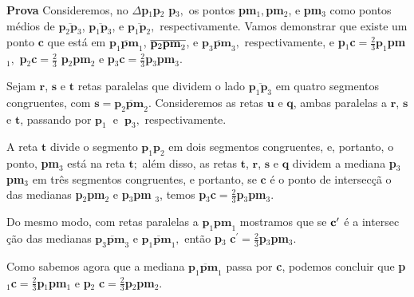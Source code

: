 \documentclass[12pt,a4paper]{book}
\begin{document}
{\bf Prova}
 Consideremos, no $\Delta $\textbf{p}$_{1}$\textbf{p}$_{2}$\textbf{%
p}$_{3},$ os pontos \textbf{pm}$_{1},$\textbf{pm}$_{2}$, e \textbf{pm}$_{3}$
como pontos m\'{e}dios de $\overline{\mathbf{p}_{2}\mathbf{p}_{3}}$, $%
\overline{\mathbf{p}_{1}\mathbf{p}_{3}}$, e $\overline{\mathbf{p}_{1}\mathbf{p%
}_{2}},$ respectivamente. Vamos demonstrar que existe um ponto $\mathbf{c}$
que est\'{a} em $\overline{\mathbf{p}_{1}\mathbf{pm}_{1}}$, $\overline{%
\mathbf{p}_{2}\mathbf{pm}_{2}}$, e $\overline{\mathbf{p}_{3}\mathbf{pm}_{3}},$
respectivamente, e \textbf{p}$_{1}$\textbf{c}$\mathbf{=}\frac{2}{3}\mathbf{p}%
_{1}$\textbf{pm}$_{1},$ \textbf{p}$_{2}$\textbf{c}$\mathbf{=}\frac{2}{3}$%
\textbf{p}$_{2}$\textbf{pm}$_{2}$ e \textbf{p}$_{3}$\textbf{c}$\mathbf{=}%
\frac{2}{3}$\textbf{p}$_{3}$\textbf{pm}$_{3}.$

Sejam $\mathbf{r}$, $\mathbf{s}$ e $\mathbf{t}$ retas paralelas que dividem o lado $\overline{\mathbf{p}_{1}\mathbf{p}_{3}}$ em quatro segmentos congruentes, com $\mathbf{s=}\overline{\mathbf{p}_{2}\mathbf{pm}_{2}}$. Consideremos as retas $\mathbf{u}$ e $\mathbf{q}$, ambas paralelas a $\mathbf{r}$, $\mathbf{s}$ e $\mathbf{t}$, passando por $\mathbf{p}_{1}$\textbf{\ }e\textbf{\ }$\mathbf{p}_{3},$ respectivamente.

A reta $\mathbf{t}$ divide o segmento $\mathbf{p}_{1}\mathbf{p}_{2}$ em
dois segmentos congruentes, e, portanto, o ponto, \textbf{pm}$_{3}$ est\'{a}
na reta $\mathbf{t};$ al\'{e}m disso, as retas $\mathbf{t}$, $\mathbf{r}$, $\mathbf{s}$ 
e $\mathbf{q}$ dividem a mediana \textbf{p}$_{3}$\textbf{pm}$_{3}$ em tr\^{e}s 
segmentos congruentes, e portanto, se $\mathbf{c}$ \'{e} o ponto de intersec\c{c}\~{a}%
o das medianas \textbf{p}$_{2}$\textbf{pm}$_{2}$ e \textbf{p}$_{3}$\textbf{pm%
}$_{3}$, temos \textbf{p}$_{3}$\textbf{c}$\mathbf{=}\frac{2}{3}$\textbf{p}$%
_{3}$\textbf{pm}$_{3}.$

Do mesmo modo, com retas paralelas a $\mathbf{p}_{1}\mathbf{pm}_{1}$ mostramos que se $\bf{c}^{\prime }$ \'{e} a intersec%
\c{c}\~{a}o das medianas $\overline{\mathbf{p}_{3}\mathbf{pm}_{3}}$ e $%
\overline{\mathbf{p}_{1}\mathbf{pm}_{1}},$ ent\~{a}o \textbf{p}$_{3}$\textbf{%
c}$^{\prime}=\frac{2}{3}$\textbf{p}$_{3}$\textbf{pm}$_{3}.$

Como sabemos agora que a mediana $\overline{\mathbf{p}_{1}\mathbf{pm}_{1}}$
passa por \textbf{c}, podemos concluir que \textbf{p}$_{1}$\textbf{c}$%
\mathbf{=}\frac{2}{3}$\textbf{p}$_{1}$\textbf{pm}$_{1}$ e \textbf{p}$_{2}$%
\textbf{c}$\mathbf{=}\frac{2}{3}$\textbf{p}$_{2}$\textbf{pm}$_{2}.$
\end{document}
